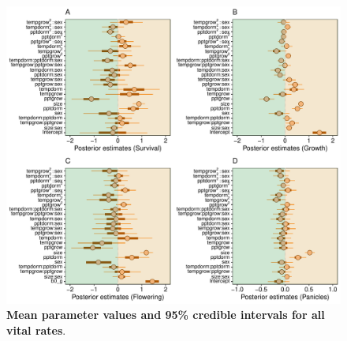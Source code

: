 \documentclass[12pt]{article}
\begin{document}
\begin{figure}[H]
		\centering
		\includegraphics[width=0.95\linewidth]{Figures/Posterior_mean.pdf}
		\caption{\textbf{Mean parameter values and 95\% credible intervals for all vital rates}. }
		\label{Sup:Posterior}
\end{figure}
	
\end{document}
